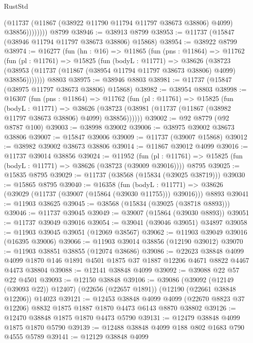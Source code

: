 \begin{lexlean}{RustStd}
\begin{coremodule}
                  (@11737 (@11867 (@38922 @11790 @11794 @11797 @38673 @38806) @4099) @38856))))))))
    @8799
@38946 := @38913 @8799
@38953 := @11737 (@15847 (@38946 @11794 @11797 @38673 @38806) @15868)
@38954 := @38922 @8799
@38974 := @16277
    (fun (hn : @16) =>
    @11865
      (fun (pns : @11864) =>
      @11762
        (fun (pl : @11761) =>
        @15825
          (fun (bodyL : @11771) =>
          @38626
            (@38723
              (@38953 (@11737 (@11867 (@38954 @11794 @11797 @38673 @38806) @4099) @38856)))))))
    @8803
@38975 := @38946 @8803
@38981 := @11737 (@15847 (@38975 @11797 @38673 @38806) @15868)
@38982 := @38954 @8803
@38998 := @16307
    (fun (pns : @11864) =>
    @11762
      (fun (pl : @11761) =>
      @15825
        (fun (bodyL : @11771) =>
        @38626 (@38723 (@38981 (@11737 (@11867 (@38982 @11797 @38673 @38806) @4099) @38856))))))
@39002 := @92 @8779 (@92 @8787 @100)
@39003 := @38998 @39002
@39006 := @38975 @39002 @38673 @38806
@39007 := @15847 @39006
@39009 := @11737 (@39007 @15868)
@39012 := @38982 @39002 @38673 @38806
@39014 := @11867 @39012 @4099
@39016 := @11737 @39014 @38856
@39024 := @11952
    (fun (pl : @11761) => @15825 (fun (bodyL : @11771) => @38626 (@38723 (@39009 @39016))))
    @8795
@39025 := @15835 @8795
@39029 := @11737 (@38568 (@15834 (@39025 @38719)))
@39030 := @15865 @8795
@39040 := @16358
    (fun (bodyL : @11771) => @38626 (@39029 (@11737 (@39007 (@15864 (@39030 @11755))) @39016)))
    @8893
@39041 := @11903 @38625
@39045 := @38568 (@15834 (@39025 (@38718 @8893)))
@39046 := @11737 @39045
@39049 := @39007 (@15864 (@39030 @8893))
@39051 := @11737 @39049 @39016
@39054 := @39041 (@39046 @39051) @34897
@39058 := @11903 @39045 @39051 (@12069 @38567)
@39062 := @11903 @39049 @39016 (@16395 @39006)
@39066 := @11903 @39014 @38856 (@12190 @39012)
@39070 := @11903 @38851 @38855 (@12074 @38686)
@39086 := @22623
    @38848
    @4099
    @4099
    @1870
    @146
    @1891
    @4501
    @1875
    @37
    @1887
    @12206
    @4671
    @8822
    @4467
    @4473
    @38804
@39088 := @12141 @38848 @4099
@39092 := @39088 @22 @57 @22 @4501
@39093 := @12150 @38848
@39106 := @39086
    (@39092 (@12149 (@39093 @22)) @12407)
    (@22656 (@22657 @1891))
    (@12190 (@22661 @38848 @12206))
    @14023
@39121 := @12453
    @38848
    @4099
    @4099
    (@22670 @8823 @37 @12206)
    @8832
    @1875
    @1887
    @1870
    @4473
    @6143
    @8870
    @38802
@39126 := @12470 @38848 @1875 @1870 @4473 @5790
@39131 := @12479 @38848 @4099 @1875 @1870 @5790
@39139 := @12488 @38848 @4099 @188 @802 @1683 @790 @4555 @5789
@39141 := @12129 @38848 @4099

\end{coremodule}
\end{lexlean}
